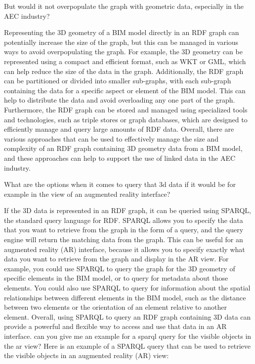 \begin{description}
	\me But would it not overpopulate the graph with geometric data, especially in the AEC industry?

	\gpt Representing the 3D geometry of a BIM model directly in an RDF graph can potentially increase the size of the graph, but this can be managed in various ways to avoid overpopulating the graph. For example, the 3D geometry can be represented using a compact and efficient format, such as WKT or GML, which can help reduce the size of the data in the graph. Additionally, the RDF graph can be partitioned or divided into smaller sub-graphs, with each sub-graph containing the data for a specific aspect or element of the BIM model. This can help to distribute the data and avoid overloading any one part of the graph. Furthermore, the RDF graph can be stored and managed using specialized tools and technologies, such as triple stores or graph databases, which are designed to efficiently manage and query large amounts of RDF data. Overall, there are various approaches that can be used to effectively manage the size and complexity of an RDF graph containing 3D geometry data from a BIM model, and these approaches can help to support the use of linked data in the AEC industry.

	\me What are the options when it comes to query that 3d data if it would be for example in the view of an augmented reality interface?

	\gpt If the 3D data is represented in an RDF graph, it can be queried using SPARQL, the standard query language for RDF. SPARQL allows you to specify the data that you want to retrieve from the graph in the form of a query, and the query engine will return the matching data from the graph. This can be useful for an augmented reality (AR) interface, because it allows you to specify exactly what data you want to retrieve from the graph and display in the AR view. For example, you could use SPARQL to query the graph for the 3D geometry of specific elements in the BIM model, or to query for metadata about those elements. You could also use SPARQL to query for information about the spatial relationships between different elements in the BIM model, such as the distance between two elements or the orientation of an element relative to another element. Overall, using SPARQL to query an RDF graph containing 3D data can provide a powerful and flexible way to access and use that data in an AR interface.
	can you give me an example for a sparql query for the visible objects in the ar view?
	Here is an example of a SPARQL query that can be used to retrieve the visible objects in an augmented reality (AR) view:


\end{description}
